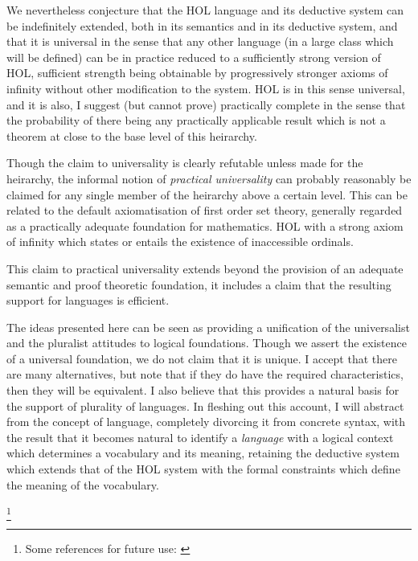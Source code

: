 \documentclass[10pt,titlepage]{book}
\begin{document}
We nevertheless conjecture that the HOL language and its deductive system can be indefinitely extended, both in its semantics and in its deductive system, and that it is universal in the sense that any other language (in a large class which will be defined) can be in practice reduced to a sufficiently strong version of HOL, sufficient strength being obtainable by progressively stronger axioms of infinity without other modification to the system.
HOL is in this sense universal, and it is also, I suggest (but cannot prove) practically complete in the sense that the probability of there being any practically applicable result which is not a theorem at close to the base level of this heirarchy.

Though the claim to universality is clearly refutable unless made for the heirarchy, the informal notion of \emph{practical universality} can probably reasonably be claimed for any single member of the heirarchy above a certain level.
This can be related to the default axiomatisation of first order set theory, generally regarded as a practically adequate foundation for mathematics.
HOL with a strong axiom of infinity which states or entails the existence of inaccessible ordinals.

This claim to practical universality extends beyond the provision of an adequate semantic and proof theoretic foundation, it includes a claim that the resulting support for languages is efficient.

The ideas presented here can be seen as providing a unification of the universalist and the pluralist attitudes to logical foundations.
Though we assert the existence of a universal foundation, we do not claim that it is unique.
I accept that there are many alternatives, but note that if they do have the required characteristics, then they will be equivalent.
I also believe that this provides a natural basis for the support of plurality of languages.
In fleshing out this account, I will abstract from the concept of language, completely divorcing it from concrete syntax, with the result that it becomes natural to identify a \emph{language} with a logical context which determines a vocabulary and its meaning, retaining the deductive system which extends that of the HOL system with the formal constraints which define the meaning of the vocabulary.


\footnote{Some references for future use:
\cite{arthan1991formal}
\cite{beeson2012foundations}
\cite{centrone2019reflections}
\cite{dzamonja2019}
\cite{gettier1963justified}
\cite{jones1992a,jones1992b}
\cite{kline1990mathematical1}
\cite{kline1990mathematical2}
\cite{kline1990mathematical3}
\cite{kumar2016self}
\cite{kuhn2000structure}
\cite{kuhn2012structure}
\cite{oliveira2006unifying}
\cite{shapiro1991foundations}
\cite{shapiroHPML}
\cite{tarski31}
\cite{tarski56}
}

{}


\end{document}
